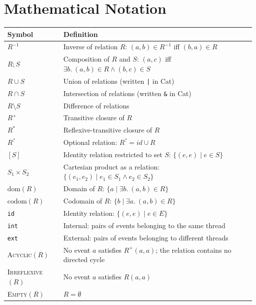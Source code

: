 \section*{Mathematical Notation}
\begin{longtable}{p{2.5cm}p{8cm}}
    \toprule
    Symbol & Definition \\
    \midrule\endhead
    $R^{-1}$                  & Inverse of relation $R$: $(a,b) \in R^{-1}$ iff $(b,a) \in R$ \\
    \midrule
    $R \mathbin{;} S$         & Composition of $R$ and $S$: $(a,c)$ iff $\exists b.\ (a,b)\in R \land (b,c)\in S$ \\
    \midrule
    $R \cup S$                & Union of relations (written \texttt{|} in Cat) \\
    \midrule
    $R \cap S$                & Intersection of relations (written \texttt{\&} in Cat) \\
    \midrule
    $R \setminus S$           & Difference of relations \\
    \midrule
    $R^{+}$                   & Transitive closure of $R$ \\
    \midrule
    $R^{*}$                   & Reflexive-transitive closure of $R$ \\
    \midrule
    $R^{?}$                   & Optional relation: $R^{?} = \mathit{id} \cup R$ \\
    \midrule
    $[S]$                     & Identity relation restricted to set $S$: $\{(e,e) \mid e \in S\}$ \\
    \midrule
    $S_1 \times S_2$          & Cartesian product as a relation: $\{(e_1,e_2) \mid e_1 \in S_1 \land e_2 \in S_2\}$ \\
    \midrule
    $\mathrm{dom}(R)$         & Domain of $R$: $\{a \mid \exists b.\ (a,b) \in R\}$ \\
    \midrule
    $\mathrm{codom}(R)$       & Codomain of $R$: $\{b \mid \exists a.\ (a,b) \in R\}$ \\
    \midrule
    \texttt{id}               & Identity relation: $\{(e,e) \mid e \in E\}$ \\
    \midrule
    \texttt{int}              & Internal: pairs of events belonging to the same thread \\
    \midrule
    \texttt{ext}              & External: pairs of events belonging to different threads \\
    \midrule
    \textsc{Acyclic}$(R)$     & No event $a$ satisfies $R^{+}(a,a)$; the relation contains no directed cycle \\
    \midrule
    \textsc{Irreflexive}$(R)$ & No event $a$ satisfies $R(a,a)$ \\
    \midrule
    \textsc{Empty}$(R)$       & $R = \emptyset$ \\
    \bottomrule
\end{longtable}
